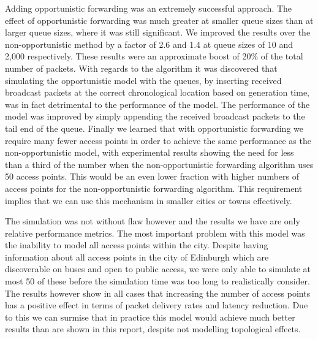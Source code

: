 Adding opportunistic forwarding was an extremely successful approach. The effect of opportunistic forwarding was much greater at smaller queue sizes than at larger queue sizes, where it was still significant. We improved the results over the non-opportunistic method by a factor of 2.6 and 1.4 at queue sizes of 10 and 2,000 respectively. These results were an approximate boost of 20\% of the total number of packets. With regards to the algorithm it was discovered that simulating the opportunistic model with the queues, by inserting received broadcast packets at the correct chronological location based on generation time, was in fact detrimental to the performance of the model. The performance of the model was improved by simply appending the received broadcast packets to the tail end of the queue. Finally we learned that with opportunistic forwarding we require many fewer access points in order to achieve the same performance as the non-opportunistic model, with experimental results showing the need for less than a third of the number when the non-opportunistic forwarding algorithm uses 50 access points. This would be an even lower fraction with higher numbers of access points for the non-opportunistic forwarding algorithm. This requirement implies that we can use this mechanism in smaller cities or towns effectively. 

The simulation was not without flaw however and the results we have are only relative performance metrics. The most important problem with this model was the inability to model all access points within the city. Despite having information about all access points in the city of Edinburgh which are discoverable on buses and open to public access, we were only able to simulate at most 50 of these before the simulation time was too long to realistically consider. The results however show in all cases that increasing the number of access points has a positive effect in terms of packet delivery rates and latency reduction. Due to this we can surmise that in practice this model would achieve much better results than are shown in this report, despite not modelling topological effects.

